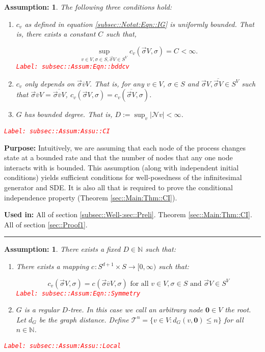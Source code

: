 \documentclass[12pt]{article}
\newcommand{\mb}{\mathbb}
\newcommand{\mc}{\mathcal}
\newcommand{\ra}{\rightarrow}
\newcommand{\ov}{\overline}
\newcommand{\te}{\text}
\newcommand{\tr}{\textcolor{red}}
\newcommand{\labe}[1]{\tr{\texttt{Label: #1}}}
\newcommand{\purpose}{\textbf{Purpose: }}
\newcommand{\usein}{\textbf{Used in: }}
\newcommand{\lin}{\rule{\linewidth}{0.4 pt}}
\newcommand{\defeq}{:=}								%
\newcommand{\neigh}{\mc{N}}					%
\renewcommand{\root}{\mathbf{0}}				%
\renewcommand{\v}{v}							%
\renewcommand{\S}{S}							%
\newcommand{\s}{\sigma}							%
\newcommand{\sv}{\vec{\s}}						%
\newcommand{\cl}{\ov}							%
\newcommand{\degr}{D}								%
\newcommand{\tree}{\mc{T}}							%
\renewcommand{\G}{G}								%
\newcommand{\V}{V}									%
\newcommand{\numb}{n}								%
\newcommand{\XState}[1]{\S^{#1}}				%
\newcommand{\IGr}[1]{c_{#1}}						%
\newcommand{\gdist}{d_G}							%
\newcommand{\const}[1]{C_{#1}}						%
\newtheorem{assu}[thms]{Assumption: }
\begin{document}
\begin{assu}
The following three conditions hold:
\begin{enumerate}
\item \(\IGr{\v}\) as defined in equation \eqref{subsec::Notat:Eqn::IG} is uniformly bounded. That is, there exists a constant \(\const{}\) such that,

\begin{equation}
\sup_{\v\in \V,\s \in \S,\sv{}{\V}\in \S^\V} \IGr{\v}(\sv{}{\V},\s) = \const{} < \infty.
\label{subsec::Assum:Eqn::bddcv}
\end{equation}
\labe{subsec::Assum:Eqn::bddcv}

\item \(\IGr{\v}\) only depends on \(\sv{\cl{\v}}{\V}\). That is, for any \(\v\in \V\), \(\s\in \S\) and \(\sv{}{\V},\ov{\sv{}{\V}} \in \S^\V\) such that \(\sv{\cl{\v}}{\V} = \ov{\sv{\cl{\v}}{\V}}\), \(\IGr{\v}(\sv{}{\V},\s) = \IGr{\v}(\ov{\sv{}{\V}},\s)\).

\item \(\G\) has bounded degree. That is, \(\degr \defeq \sup_\v |\neigh{\v}| < \infty\).
\end{enumerate}
\label{subsec::Assum:Assu::CI}\labe{subsec::Assum:Assu::CI}
\end{assu}

\purpose Intuitively, we are assuming that each node of the process changes state at a bounded rate and that the number of nodes that any one node interacts with is bounded. This assumption (along with independent initial conditions) yields sufficient conditions for well-posedness of the infinitesimal generator and SDE. It is also all that is required to prove the conditional independence property (Theorem \ref{sec::Main:Thm::CI}). 

\usein All of section \ref{subsec::Well-:sec::Preli}. Theorem \ref{sec::Main:Thm::CI}. All of section \ref{sec::Proof1}.

\lin

\begin{assu}
There exists a fixed \(\degr\in \mb{N}\) such that:

\begin{enumerate}
\item There exists a mapping \(\IGr{}: \S^{d+1} \times \S \ra [0,\infty)\) such that:

\begin{equation}
\IGr{\v}(\sv{}{\V},\s) = \IGr{}(\sv{\cl{\v}}{\V},\s) \te{ for all } \v\in \V, \s\in \S\te{ and } \sv{}{\V} \in \S^\V
\label{subsec::Assum:Eqn::Symmetry}
\end{equation}
\labe{subsec::Assum:Eqn::Symmetry}

\item \(\G\) is a regular \(\degr\)-tree. In this case we call an arbitrary node \(\root\in \V\) the root. Let \(\gdist\) be the graph distance. Define \(\tree^\numb = \{\v \in \V: \gdist(\v,\root) \leq \numb\}\) for all \(\numb\in \mb{N}\).
\end{enumerate}
\label{subsec::Assum:Assu::Local}\labe{subsec::Assum:Assu::Local}
\end{assu}
\end{document}
